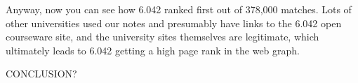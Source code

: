 Anyway, now you can see how 6.042 ranked first out of 378,000 matches.
Lots of other universities used our notes and presumably have links to the
6.042 open courseware site, and the university sites themselves are
legitimate, which ultimately leads to 6.042 getting a high page rank in
the web graph.

\begin{problems}
\practiceproblems
{}

\classproblems
{}

\homeworkproblems
{}

\examproblems
{}

\end{problems}
\begin{editingnotes}
CONCLUSION?
\end{editingnotes}
\endinput
